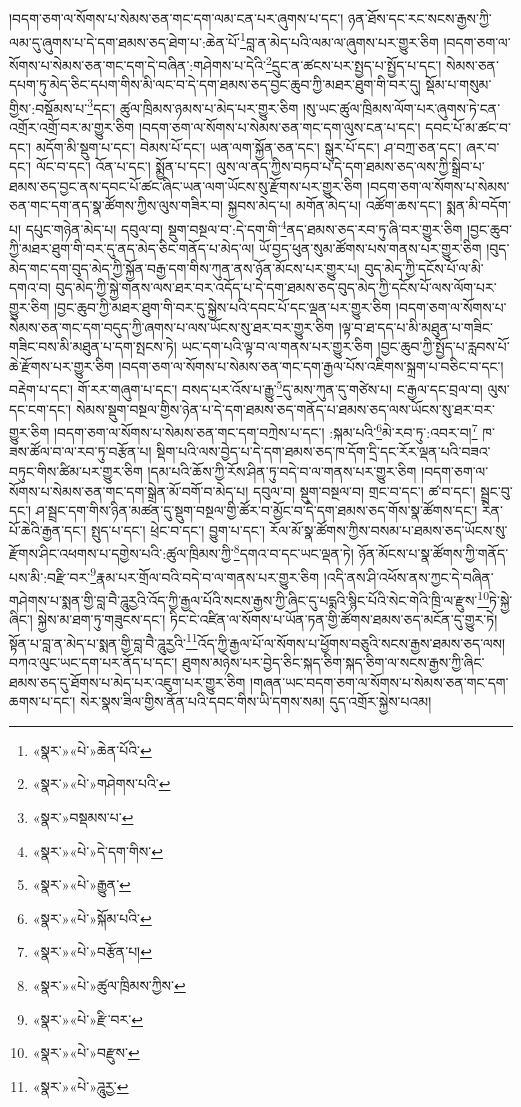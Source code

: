 །བདག་ཅག་ལ་སོགས་པ་སེམས་ཅན་གང་དག་ལམ་ངན་པར་ཞུགས་པ་དང་། ཉན་ཐོས་དང་རང་སངས་རྒྱས་ཀྱི་ལམ་དུ་ཞུགས་པ་དེ་དག་ཐམས་ཅད་ཐེག་པ་:ཆེན་པོ་\footnote{«སྣར་»«པེ་»ཆེན་པོའི་}བླ་ན་མེད་པའི་ལམ་ལ་ཞུགས་པར་གྱུར་ཅིག །བདག་ཅག་ལ་སོགས་པ་སེམས་ཅན་གང་དག་དེ་བཞིན་:གཤེགས་པ་དེའི་\footnote{«སྣར་»«པེ་»གཤེགས་པའི་}དྲུང་ན་ཚངས་པར་སྤྱད་པ་སྤྱོད་པ་དང་། སེམས་ཅན་དཔག་ཏུ་མེད་ཅིང་དཔག་གིས་མི་ལང་བ་དེ་དག་ཐམས་ཅད་བྱང་ཆུབ་ཀྱི་མཐར་ཐུག་གི་བར་དུ། སྡོམ་པ་གསུམ་གྱིས་:བསྡོམས་པ་\footnote{«སྣར་»བསྡམས་པ་}དང་། ཚུལ་ཁྲིམས་ཉམས་པ་མེད་པར་གྱུར་ཅིག །སུ་ཡང་ཚུལ་ཁྲིམས་ལོག་པར་ཞུགས་ཏེ་ངན་འགྲོར་འགྲོ་བར་མ་གྱུར་ཅིག །བདག་ཅག་ལ་སོགས་པ་སེམས་ཅན་གང་དག་ལུས་ངན་པ་དང་། དབང་པོ་མ་ཚང་བ་དང་། མདོག་མི་སྡུག་པ་དང་། བེམས་པོ་དང་། ཡན་ལག་སྐྱོན་ཅན་དང་། སྒུར་པོ་དང་། ཤ་བཀྲ་ཅན་དང་། ཞར་བ་དང་། ལོང་བ་དང་། འོན་པ་དང་། སྨྱོན་པ་དང་། ལུས་ལ་ནད་ཀྱིས་བཏབ་པ་དེ་དག་ཐམས་ཅད་ལས་ཀྱི་སྒྲིབ་པ་ཐམས་ཅད་བྱང་ནས་དབང་པོ་ཚང་ཞིང་ཡན་ལག་ཡོངས་སུ་རྫོགས་པར་གྱུར་ཅིག །བདག་ཅག་ལ་སོགས་པ་སེམས་ཅན་གང་དག་ནད་སྣ་ཚོགས་ཀྱིས་ལུས་གཟིར་བ། སྐྱབས་མེད་པ། མགོན་མེད་པ། འཚོག་ཆས་དང་། སྨན་མི་བདོག་པ། དཔུང་གཉེན་མེད་པ། དབུལ་བ། སྡུག་བསྔལ་བ་:དེ་དག་གི་\footnote{«སྣར་»«པེ་»དེ་དག་གིས་}ནད་ཐམས་ཅད་རབ་ཏུ་ཞི་བར་གྱུར་ཅིག །བྱང་ཆུབ་ཀྱི་མཐར་ཐུག་གི་བར་དུ་ནད་མེད་ཅིང་གནོད་པ་མེད་ལ། ཡོ་བྱད་ཕུན་སུམ་ཚོགས་པས་གནས་པར་གྱུར་ཅིག །བུད་མེད་གང་དག་བུད་མེད་ཀྱི་སྐྱོན་བརྒྱ་དག་གིས་ཀུན་ནས་ཉོན་མོངས་པར་གྱུར་པ། བུད་མེད་ཀྱི་དངོས་པོ་ལ་མི་དགའ་བ། བུད་མེད་ཀྱི་སྐྱེ་གནས་ལས་ཐར་བར་འདོད་པ་དེ་དག་ཐམས་ཅད་བུད་མེད་ཀྱི་དངོས་པོ་ལས་ལོག་པར་གྱུར་ཅིག །བྱང་ཆུབ་ཀྱི་མཐར་ཐུག་གི་བར་དུ་སྐྱེས་པའི་དབང་པོ་དང་ལྡན་པར་གྱུར་ཅིག །བདག་ཅག་ལ་སོགས་པ་སེམས་ཅན་གང་དག་བདུད་ཀྱི་ཞགས་པ་ལས་ཡོངས་སུ་ཐར་བར་གྱུར་ཅིག །ལྟ་བ་ཐ་དད་པ་མི་མཐུན་པ་གཟིང་གཟིང་བས་མི་མཐུན་པ་དག་སྤངས་ཏེ། ཡང་དག་པའི་ལྟ་བ་ལ་གནས་པར་གྱུར་ཅིག །བྱང་ཆུབ་ཀྱི་སྤྱོད་པ་རླབས་པོ་ཆེ་རྫོགས་པར་གྱུར་ཅིག །བདག་ཅག་ལ་སོགས་པ་སེམས་ཅན་གང་དག་རྒྱལ་པོས་འཇིགས་སྐྲག་པ་བཅིང་བ་དང་། བརྡེག་པ་དང་། གོ་རར་གཞུག་པ་དང་། བསད་པར་འོས་པ་རྒྱུ་\footnote{«སྣར་»«པེ་»རྒྱུན་}དུ་མས་ཀུན་དུ་གཙེས་པ། ང་རྒྱལ་དང་བྲལ་བ། ལུས་དང་ངག་དང་། སེམས་སྡུག་བསྔལ་གྱིས་ཉེན་པ་དེ་དག་ཐམས་ཅད་གནོད་པ་ཐམས་ཅད་ལས་ཡོངས་སུ་ཐར་བར་གྱུར་ཅིག །བདག་ཅག་ལ་སོགས་པ་སེམས་ཅན་གང་དག་བཀྲེས་པ་དང་། :སྐམ་པའི་\footnote{«སྣར་»«པེ་»སྐོམ་པའི་}མེ་རབ་ཏུ་:འབར་བ།\footnote{«སྣར་»«པེ་»བརྩོན་པ།} ཁ་ཟས་ཚོལ་བ་ལ་རབ་ཏུ་བརྩོན་པ། སྡིག་པའི་ལས་བྱེད་པ་དེ་དག་ཐམས་ཅད་ཁ་དོག་དྲི་དང་རོར་ལྡན་པའི་བཟའ་བཏུང་གིས་ཚིམ་པར་གྱུར་ཅིག །དམ་པའི་ཆོས་ཀྱི་རོས་ཤིན་ཏུ་བདེ་བ་ལ་གནས་པར་གྱུར་ཅིག །བདག་ཅག་ལ་སོགས་པ་སེམས་ཅན་གང་དག་སྒྲེན་མོ་བགོ་བ་མེད་པ། དབུལ་བ། སྡུག་བསྔལ་བ། གྲང་བ་དང་། ཚ་བ་དང་། སྦྲང་བུ་དང་། ཤ་སྦྲང་དག་གིས་ཉིན་མཚན་དུ་སྡུག་བསྔལ་གྱི་ཚོར་བ་མྱོང་བ་དེ་དག་ཐམས་ཅད་གོས་སྣ་ཚོགས་དང་། རིན་པོ་ཆེའི་རྒྱན་དང་། སྤུད་པ་དང་། ཕྲེང་བ་དང་། བྱུག་པ་དང་། རོལ་མོ་སྣ་ཚོགས་ཀྱིས་བསམ་པ་ཐམས་ཅད་ཡོངས་སུ་རྫོགས་ཤིང་འཕགས་པ་དགྱེས་པའི་:ཚུལ་ཁྲིམས་ཀྱི་\footnote{«སྣར་»«པེ་»ཚུལ་ཁྲིམས་ཀྱིས་}དགའ་བ་དང་ཡང་ལྡན་ཏེ། ཉོན་མོངས་པ་སྣ་ཚོགས་ཀྱི་གནོད་པས་མི་:བརྫི་བར་\footnote{«སྣར་»«པེ་»རྫི་བར་}རྣམ་པར་གྲོལ་བའི་བདེ་བ་ལ་གནས་པར་གྱུར་ཅིག །འདི་ནས་ཤི་འཕོས་ནས་ཀྱང་དེ་བཞིན་གཤེགས་པ་སྨན་གྱི་བླ་བཻ་ཌཱུརྱའི་འོད་ཀྱི་རྒྱལ་པོའི་སངས་རྒྱས་ཀྱི་ཞིང་དུ་པདྨའི་སྙིང་པོའི་སེང་གེའི་ཁྲི་ལ་རྫུས་\footnote{«སྣར་»«པེ་»བརྫུས་}ཏེ་སྐྱེ་ཞིང་། སྐྱེས་མ་ཐག་ཏུ་གཟུངས་དང་། ཏིང་ངེ་འཛིན་ལ་སོགས་པ་ཡོན་ཏན་གྱི་ཚོགས་ཐམས་ཅད་མངོན་དུ་གྱུར་ཏེ། སྟོན་པ་བླ་ན་མེད་པ་སྨན་གྱི་བླ་བཻ་ཌཱུརྱའི་\footnote{«སྣར་»«པེ་»ཌཱུརྱ་}འོད་ཀྱི་རྒྱལ་པོ་ལ་སོགས་པ་ཕྱོགས་བཅུའི་སངས་རྒྱས་ཐམས་ཅད་ལས། བཀའ་ལུང་ཡང་དག་པར་ནོད་པ་དང་། ཐུགས་མཉེས་པར་བྱེད་ཅིང་སྐད་ཅིག་སྐད་ཅིག་ལ་སངས་རྒྱས་ཀྱི་ཞིང་ཐམས་ཅད་དུ་ཐོགས་པ་མེད་པར་འཇུག་པར་གྱུར་ཅིག །གཞན་ཡང་བདག་ཅག་ལ་སོགས་པ་སེམས་ཅན་གང་དག་ཆགས་པ་དང་། སེར་སྣས་ཟིལ་གྱིས་ནོན་པའི་དབང་གིས་ཡི་དགས་སམ། དུད་འགྲོར་སྐྱེས་པའམ། 